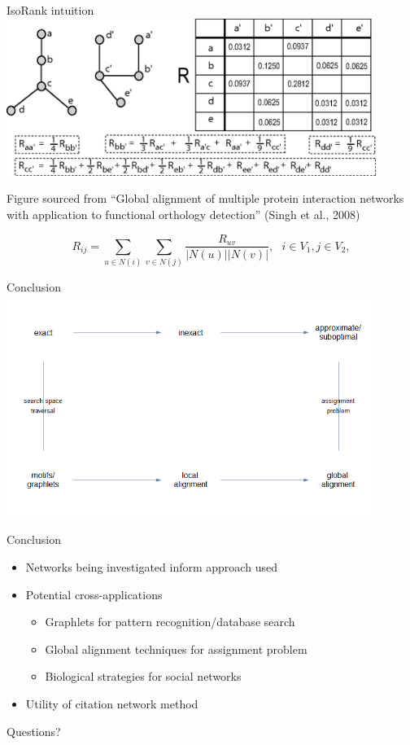 \documentclass[xcolor=dvipsnames, 14pt]{beamer}
\begin{document}
\begin{frame}{IsoRank intuition}
\centering
\footnotesize
\includegraphics[width=0.9\textwidth]{IsoRank_demo.png}

\tiny Figure sourced from ``Global alignment of multiple protein interaction networks with application to functional orthology detection'' (Singh et al., 2008)


\[R_{ij} = \sum_{u\in N(i)} \sum_{v\in N(j)} \frac{R_{uv}}{|N(u)||N(v)|}, \text{    } i\in V_1, j\in V_2, \]
\end{frame}

\begin{frame}{Conclusion}
\centering
\includegraphics[width=0.9\textwidth]{connections_figure.png}
\end{frame}

\begin{frame}{Conclusion}
\begin{itemize}
\item Networks being investigated inform approach used
\pause
\item Potential cross-applications
\begin{itemize}
\item Graphlets for pattern recognition/database search
\item Global alignment techniques for assignment problem
\item Biological strategies for social networks
\end{itemize}
\pause
\item Utility of citation network method
\end{itemize}
\end{frame}

\begin{frame}
\centering
\Large 
Questions?
\end{frame}
\end{document}
